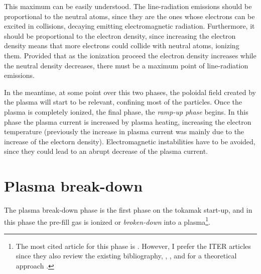 \documentclass[a4paper,12pt,oneside]{book}
\begin{document}
This maximum can be easily understood. The line-radiation emissions should be proportional to the neutral atoms, since they are the ones whose electrons can be excited in collisions, decaying emitting electromagnetic radiation. Furthermore, it should be proportional to the electron density, since increasing the electron density means that more electrons could collide with neutral atoms, ionizing them. Provided that as the ionization proceed the electron density increases while the neutral density decreases, there must be a maximum point of line-radiation emissions.

In the meantime, at some point over this two phases, the poloidal field created by the plasma will start to be relevant, confining most of the particles. Once the plasma is completely ionized, the final phase, the \textit{ramp-up phase} begins. In this phase the plasma current is increased by plasma heating, increasing the electron temperature (previously the increase in plasma current was mainly due to the increase of the electorn density). Electromagnetic instabilities have to be avoided, since they could lead to an abrupt decrease of the plasma current.
%
%
\section{Plasma break-down}
\label{sec_breakdown}
The plasma break-down phase is the first phase on the tokamak start-up, and in this phase the pre-fill gas is ionized or \textit{broken-down} into a plasma\footnote{The most cited article for this phase is \cite{Lloyd_1991}. However, I prefer the ITER articles since they also review the existing bibliography, \cite{ITER_1999}, \cite{ITER_2007}, and for a theoretical approach \cite{ITER_2019}.}.
\end{document}
